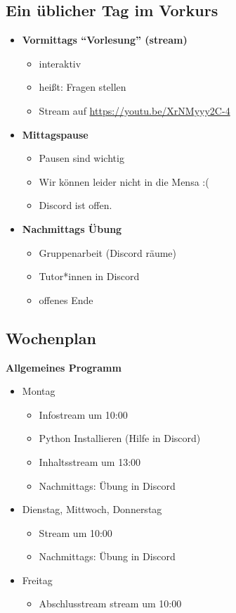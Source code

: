 \subsection{Ein üblicher Tag im Vorkurs}
\begin{frame}
	\slidehead
	\begin{itemize}
		\item \textbf{Vormittags "`Vorlesung"' (stream)}
		\begin{itemize}
			\item interaktiv
			\item heißt: Fragen stellen
			\item Stream auf \href{https://youtu.be/XrNMyyy2C-4}{https://youtu.be/XrNMyyy2C-4}
		\end{itemize}
		\item \textbf{Mittagspause}
		\begin{itemize}
			\item Pausen sind wichtig
			\item Wir können leider nicht in die Mensa :(
			\item Discord ist offen.
		\end{itemize}
		\item \textbf{Nachmittags Übung}
		\begin{itemize}
			\item Gruppenarbeit (Discord räume)
			\item Tutor*innen in Discord
			\item offenes Ende
		\end{itemize}
	\end{itemize}
\end{frame}

\subsection{Wochenplan}
\begin{frame}
	\slidehead
	\textbf{Allgemeines Programm}
	\begin{itemize}
		\item Montag
		\begin{itemize}
			\item Infostream um 10:00
			\item Python Installieren (Hilfe in Discord)
			\item Inhaltsstream um 13:00
			\item Nachmittags: Übung in Discord
		\end{itemize}
		\item Dienstag, Mittwoch, Donnerstag
		\begin{itemize}
			\item Stream um 10:00
			\item Nachmittags: Übung in Discord
		\end{itemize}
		\item Freitag
		\begin{itemize}
			\item Abschlusstream stream um 10:00
		\end{itemize}
	\end{itemize}
\end{frame}

